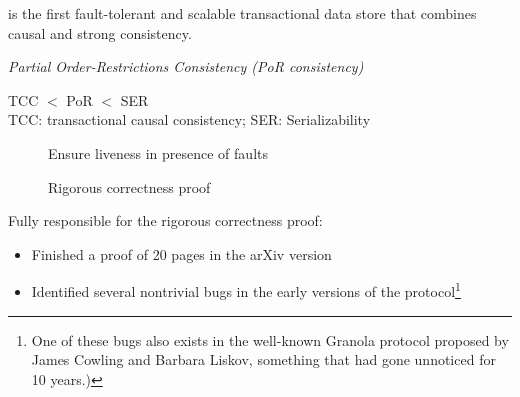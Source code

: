 
\begin{frame}{}
  \begin{center}
    \vspace{0.20cm}

    \vspace{1.00cm}
    \unistore{} is the first fault-tolerant and scalable transactional data store
    that combines causal and strong consistency.
  \end{center}
\end{frame}

\begin{frame}{}
  \begin{center}
    {\it Partial Order-Restrictions Consistency (PoR consistency)}

    \vspace{0.30cm}
    TCC $<$ PoR $<$ SER \\[6pt]
    TCC: transactional causal consistency; SER: Serializability

    \vspace{1.20cm}
    \begin{description}
      \item[] Ensure liveness in presence of faults \\[10pt]
      \item[] Rigorous correctness proof
    \end{description}
  \end{center}
\end{frame}

\begin{frame}{} %
  \begin{center}
    \vspace{0.20cm}

    \vspace{1.20cm}
    Fully responsible for the rigorous correctness proof: \\[3pt]

    \begin{itemize}
      \item Finished a proof of 20 pages in the \textsf{arXiv} version
      \item Identified several nontrivial bugs
            in the early versions of the protocol\footnote{
              One of these bugs also exists in the well-known Granola protocol
              proposed by James Cowling and Barbara Liskov,
              something that had gone unnoticed for 10 years.)}
    \end{itemize}
  \end{center}
\end{frame}

